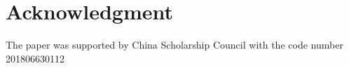 \section*{Acknowledgment}
The paper was supported by China Scholarship Council with
the code number 201806630112
